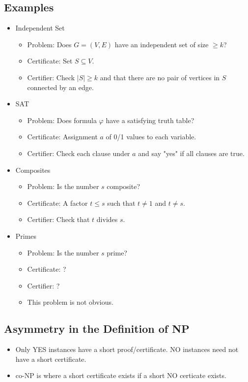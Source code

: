 \documentclass[12pt]{article}
\begin{document}
\subsection{Examples}
\begin{itemize}
    \item Independent Set
    \begin{itemize}
        \item Problem: Does $G = (V, E)$ have an independent set of size $\geq k$?
        \item Certificate: Set $S \subseteq V$.
        \item Certifier: Check $\left| S \right| \geq k$ and that there are no pair of vertices in $S$ connected by an edge.
    \end{itemize}
    \item SAT
    \begin{itemize}
        \item Problem: Does formula $\varphi$ have a satisfying truth table?
        \item Certificate: Assignment $a$ of 0/1 values to each variable.
        \item Certifier: Check each clause under $a$ and say "yes" if all clauses are true.
    \end{itemize}
    \item Composites
    \begin{itemize}
        \item Problem: Is the number $s$ composite?
        \item Certificate: A factor $t \leq s$ such that $t \neq 1$ and $t \neq s$.
        \item Certifier: Check that $t$ divides $s$.
    \end{itemize}
    \item Primes
    \begin{itemize}
        \item Problem: Is the number $s$ prime?
        \item Certificate: ?
        \item Certifier: ?
        \item This problem is not obvious.
    \end{itemize}
\end{itemize}

\subsection{Asymmetry in the Definition of NP}
\begin{itemize}
    \item Only YES instances have a short proof/certificate. NO instances need not have a short certificate.
    \item co-NP is where a short certificate exists if a short NO certicate exists.
\end{itemize}
\end{document}
